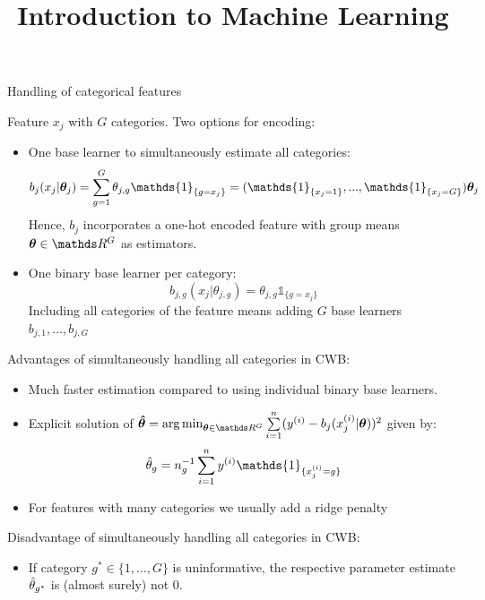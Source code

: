 \documentclass[11pt,compress,t,notes=noshow, xcolor=table]{beamer}
\title{Introduction to Machine Learning}\date{}
\begin{document}


\begin{vbframe}{Handling of categorical features}

Feature $x_j$ with $G$ categories. Two options for encoding:

\begin{itemize}
    \item 
        One base learner to simultaneously estimate all categories: 
        $$b_j(x_j | \thetab_j) = \sum_{g=1}^G \theta_{j,g}\mathds{1}_{\{g = x_j\}} = (\mathds{1}_{\{x_j = 1\}}, ..., \mathds{1}_{\{x_j = G\}}) \thetab_j$$
        Hence, $b_j$ incorporates a one-hot encoded feature with group means $\thetab\in\R^G$ as estimators. 
    
    \item 
        One binary base learner per category:
        $$b_{j,g}(x_j | \theta_{j,g}) = \theta_{j,g}\mathds{1}_{\{g = x_j\}}$$  
        Including all categories of the feature means adding $G$ base learners $b_{j,1}, \dots, b_{j,G}$ %
  \end{itemize}

\framebreak

Advantages of simultaneously handling all categories in CWB: 
\begin{itemize}
    \item 
        Much faster estimation compared to using individual binary base learners.

    \item 
        Explicit solution of $\thetabh = \argmin_{\thetab\in\R^G}\sumin (\yi - b_j(x^{(i)}_j | \thetab))^2$ given by:
        $$
        \thetah_g = n_g^{-1}\sumin \yi \mathds{1}_{\{x^{(i)}_j = g\}}
        $$

    \item 
        For features with many categories we usually add a ridge penalty
\end{itemize}

Disadvantage of simultaneously handling all categories in CWB: 
\begin{itemize}
    \item 
        If category $g^\ast\in\{1, \dots, G\}$ is uninformative, the respective parameter estimate $\hat{\theta}_{g^\ast}$ is (almost surely) not $0$.
\end{itemize}


\end{vbframe}
\end{document}
